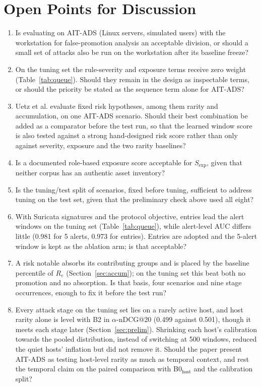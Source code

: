 \documentclass[conference]{IEEEtran}
\begin{document}
\section{Open Points for Discussion}
\label{sec:open}

\begin{enumerate}
\item Is evaluating on AIT-ADS (Linux servers, simulated users) with the workstation for false-promotion analysis an acceptable division, or should a small set of attacks also be run on the workstation after its baseline freeze?
\item On the tuning set the rule-severity and exposure terms receive zero weight (Table~\ref{tab:queue}). Should they remain in the design as inspectable terms, or should the priority be stated as the sequence term alone for AIT-ADS?
\item Uetz et al. \cite{ref26} evaluate fixed risk hypotheses, among them rarity and accumulation, on one AIT-ADS scenario. Should their best combination be added as a comparator before the test run, so that the learned window score is also tested against a strong hand-designed risk score rather than only against severity, exposure and the two rarity baselines?
\item Is a documented role-based exposure score acceptable for $S_\mathrm{exp}$, given that neither corpus has an authentic asset inventory?
\item Is the tuning/test split of scenarios, fixed before tuning, sufficient to address tuning on the test set, given that the preliminary check above used all eight?
\item With Suricata signatures and the protocol objective, entries lead the alert windows on the tuning set (Table~\ref{tab:queue}), while alert-level AUC differs little (0.981 for 5 alerts, 0.973 for entries). Entries are adopted and the 5-alert window is kept as the ablation arm; is that acceptable?
\item A risk notable absorbs its contributing groups and is placed by the baseline percentile of $R_e$ (Section~\ref{sec:accum}); on the tuning set this beat both no promotion and no absorption. Is that basis, four scenarios and nine stage occurrences, enough to fix it before the test run?
\item Every attack stage on the tuning set lies on a rarely active host, and host rarity alone is level with B2 in $\alpha$-nDCG@20 (0.499 against 0.501), though it meets each stage later (Section~\ref{sec:prelim}). Shrinking each host's calibration towards the pooled distribution, instead of switching at 500 windows, reduced the quiet hosts' inflation but did not remove it. Should the paper present AIT-ADS as testing host-level rarity as much as temporal context, and rest the temporal claim on the paired comparison with B0$_\mathrm{host}$ and the calibration split?

\end{enumerate}
\end{document}

